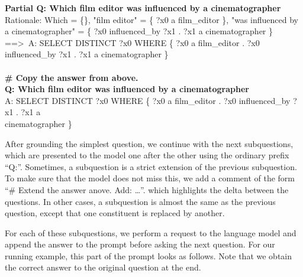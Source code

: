 \documentclass{article} \usepackage{iclr2022_conference,times}
\newcommand{\prompt}[1]{{\footnotesize \textsf{#1}}}
\begin{document}
\prompt{\textbf{Partial Q: Which film editor was influenced by a cinematographer} \\
Rationale: Which = \{\}, "film editor" = \{ ?x0 a film\_editor \}, "was influenced by a cinematographer" = \{ ?x0 influenced\_by ?x1 . ?x1 a cinematographer \} ==\textgreater\ A: SELECT DISTINCT ?x0 WHERE \{ ?x0 a film\_editor . ?x0 influenced\_by ?x1 . ?x1 a cinematographer \} \\
\\
\textbf{\# Copy the answer from above.} \\
\textbf{Q: Which film editor was influenced by a cinematographer} \\
A: SELECT DISTINCT ?x0 WHERE \{ ?x0 a film\_editor . ?x0 influenced\_by ?x1 . ?x1 a \\ cinematographer \}
}

After grounding the simplest question, we continue with the next subquestions, which are presented to the model one after the other using the ordinary prefix ``Q:''. Sometimes, a subquestion is a strict extension of the previous subquestion. To make sure that the model does not miss this, we add a comment of the form ``\# Extend the answer anove. Add: \ldots''. which highlights the delta between the questions. In other cases, a subquestion is almost the same as the previous question, except that one constituent is replaced by another.

For each of these subquestions, we perform a request to the language model and append the answer to the prompt before asking the next question. For our running example, this part of the prompt looks as follows. Note that we obtain the correct answer to the original question at the end.
\end{document}
